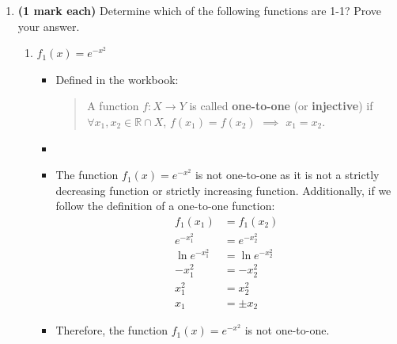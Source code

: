 \documentclass[12pt]{report}
\begin{document}
\begin{enumerate}[leftmargin=\labelsep]
    \item {\bf (1 mark each)} Determine which of the following functions are 1-1? Prove your answer.
        \begin{enumerate}
            \item $f_1(x)=e^{-x^2}$
                \begin{tcolorbox}
                    \begin{itemize}[label={}]
                        \item Defined in the workbook:
                        \begin{quote}
                            A function $f: X\to Y$ is called {\bf one-to-one} (or {\bf injective}) if $\forall x_1,x_2 \in \mathbb{R} \cap X$, $f(x_1)=f(x_2)$ $\implies$ $x_1=x_2$.
                        \end{quote}
                        \item
                        \item The function $f_1(x)=e^{-x^2}$ is not one-to-one as it is not a strictly decreasing function or strictly increasing function. Additionally, if we follow the definition of a one-to-one function:
                        \begin{equation*}
                            \begin{split}
                                f_1(x_1) &= f_1(x_2) \\
                                e^{-x_1^2} &= e^{-x_2^2} \\
                                \ln e^{-x_1^2} &= \ln e^{-x_2^2} \\
                                -x_1^2 &= -x_2^2 \\
                                x_1^2 &= x_2^2 \\
                                x_1 &= \pm x_2
                            \end{split}
                        \end{equation*}
                        \item Therefore, the function $f_1(x)=e^{-x^2}$ is not one-to-one.
                        
                    \end{itemize}
                \end{tcolorbox}
                

\end{enumerate}
\end{enumerate}
\end{document}
